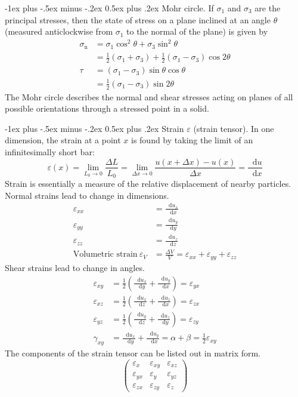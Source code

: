 \documentclass[10pt,landscape,a4paper]{article}
\makeatletter
\renewcommand\d{\mathop{}\!\mathrm{d}}
\renewcommand{\section}{\@startsection{section}{1}{0mm}%
	{-1ex plus -.5ex minus -.2ex}%
	{0.5ex plus .2ex}%
	{\normalfont\large\bfseries}}
\makeatother
\begin{document}
\begin{multicols}{3}
		\section{Mohr circle.}
		If $ \sigma_1 $ and $ \sigma_3 $ are the principal stresses, then the state of stress on a plane inclined at an angle $ \theta $ (measured anticlockwise from $ \sigma_1 $ to the normal of the plane) is given by
			\begin{align*}
				\sigma_\text{n}&=\sigma_1\cos^2\theta+\sigma_3\sin^2\theta\\
				&=\frac{1}{2}(\sigma_1+\sigma_3)+\frac{1}{2}(\sigma_1-\sigma_3)\cos2\theta\\
				\tau&=(\sigma_1-\sigma_3)\sin\theta\cos\theta\\
				&=\frac{1}{2}(\sigma_1-\sigma_3)\sin2\theta
			\end{align*}
		The Mohr circle describes the normal and shear stresses acting on planes of all possible orientations through a stressed point in a solid.
		
		\section{Strain $ \varepsilon $ (strain tensor).}
		In one dimension, the strain at a point $x$ is found by taking the limit of an infinitesimally short bar:
		\[
			\varepsilon(x)=\lim_{L_0\to0}\frac{\Delta L}{L_0}=\lim_{\Delta x\to0}\frac{u(x+\Delta x)-u(x)}{\Delta x}=\frac{\d u}{\d x}
		\]
		Strain is essentially a measure of the relative displacement of nearby particles.\\
		Normal strains lead to change in dimensions.
			\begin{align*}
				\varepsilon_{xx}&=\frac{\d u_x}{\d x}\\
				\varepsilon_{yy}&=\frac{\d u_y}{\d y}\\
				\varepsilon_{zz}&=\frac{\d u_z}{\d z}\\
				\text{Volumetric strain} \ \varepsilon_V&=\frac{\Delta V}{V}=\varepsilon_{xx}+\varepsilon_{yy}+\varepsilon_{zz}
			\end{align*}
		Shear strains lead to change in angles.
			\begin{align*}
				\varepsilon_{xy}&=\frac{1}{2}\left(\frac{\d u_x}{\d y}+\frac{\d u_y}{\d x}\right)=\varepsilon_{yx}\\
				\varepsilon_{xz}&=\frac{1}{2}\left(\frac{\d u_x}{\d z}+\frac{\d u_z}{\d x}\right)=\varepsilon_{zx}\\
				\varepsilon_{yz}&=\frac{1}{2}\left(\frac{\d u_y}{\d z}+\frac{\d u_z}{\d y}\right)=\varepsilon_{zy}\\
				\gamma_{xy}&=\frac{\d u_x}{\d y}+\frac{\d u_y}{\d x}=\alpha+\beta=\frac{1}{2}\varepsilon_{xy}
			\end{align*}
		The components of the strain tensor can be listed out in matrix form.
		\[
			\begin{pmatrix}
				\varepsilon_x & \varepsilon_{xy} & \varepsilon_{xz}\\
				\varepsilon_{yx} & \varepsilon_y & \varepsilon_{yz}\\
				\varepsilon_{zx} & \varepsilon_{zy} & \varepsilon_z
			\end{pmatrix}
		\]
		

\end{multicols}
\end{document}
